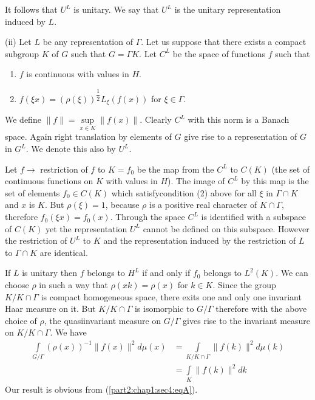 It follows that $U^L$ is unitary. We say that $U^L$ is the unitary
representation induced by $L$. 

(ii) Let $L$ be any representation of $\Gamma$. Let us suppose that
there exists a compact subgroup $K$ of $G$ such that  $G=\Gamma
K$. Let $C^L$ be the space of functions $f$ such that  
\begin{enumerate}[(1)]
\item $f$ is continuous with values in $H$.
\item $f(\xi x)=(\rho(\xi))^{\dfrac{1}{2}} L_\xi (f(x))$ for $\xi \in \Gamma$.
\end{enumerate} 

 We define $\parallel f \parallel=\sup\limits_{x \in K} \parallel
 f(x) \parallel$. Clearly $C^L$ with this norm is a Banach
 space. Again right translation by elements of $G$ give rise to a
 representation of $G$ in $G^L$. We denote this also by $U^L$. 
 
 Let $ f \to $ restriction of $f$ to $K=f_0$ be the map from the
 $C^L$ to $C(K)$ (the set of continuous functions on $K$ with values in
 $H$). The image of $C^L$ by this map is the set of elements $f_0 \in
 C(K)$ which satisfy\pageoriginale condition (2) above for all $ \xi $ in $\Gamma
 \cap K$ and $x$ is $K$. But $\rho (\xi)=1$, because $\rho$ is a positive
 real character of $K \cap \Gamma$, therefore $f_0 (\xi
 x)=f_0(x)$. Through the space $C^L$ is identified with a subspace of
 $C(K)$ yet the representation $U^L$ cannot be defined on this
 subspace. However the restriction  of $U^L$ to $K$ and the
 representation induced by the restriction of $L$ to $\Gamma \cap K$
 are identical. 
 
 If $L$ is unitary then $f$ belongs to $H^L$ if and only if $f_0$
 belongs to $L^2(K)$. We can choose $\rho$ in such a way that $\rho (x
 k)=\rho (x)$ for $k \in K$. Since the group $K/K\cap\Gamma$ is
 compact homogeneous space, there exits one and only one invariant
 Haar measure on it. But $K/K\cap \Gamma$ is isomorphic to $G/ \Gamma$
 therefore with the above choice of $\rho$, the quasiinvariant
 measure on $G/ \Gamma$ gives rise to the invariant measure on $K/K
 \cap \Gamma$. We have 
 \begin{align*}
   \underset {G/ \Gamma}\int (\rho(x))^{-1} \parallel f(x) \parallel^2
   d\mu (x) &=\underset {K/K \cap \Gamma}\int \parallel f(k)
   \parallel^2 d \mu (k)\\ 
   &= \underset {K} \int \parallel f(k) \parallel^2 dk
   \tag{A}\label{part2:chap1:sec4:eqA} 
\end{align*} 
Our result is obvious from (\ref{part2:chap1:sec4:eqA}).

